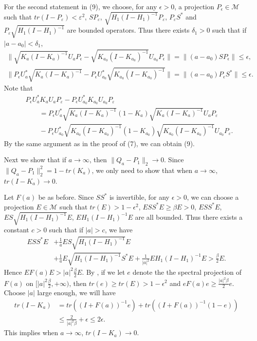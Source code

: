\documentclass[12pt]{article}
\newcommand{\MMM}{\mathcal M}
\begin{document}
{For the second statement in (9), we choose, for any $\epsilon > 0$,
a projection $P_\epsilon \in \MMM$ such that $tr(I -
P_{\varepsilon}) < \varepsilon^{2}$, $SP_{\varepsilon}$,
$\sqrt{H_{1}(I-H_{1})^{-1}}P_{\varepsilon}$,  $P_{\varepsilon}S^*$
and $P_{\varepsilon}\sqrt{H_{1}(I-H_{1})^{-1}}$ are bounded
operators. Thus there exists $\delta_{1} > 0$ such that if
$|a-a_{0}| < \delta_{1}$, 
\begin{align*}
\| \sqrt{K_a(I-K_a)^{-1}}U_{a}P_{\epsilon} -
\sqrt{K_{a_0}(I-K_{a_{0}})^{-1}}U_{a_0}P_{\epsilon}  \| = \|(a - a_0)SP_{\epsilon}  \| \leq
\epsilon, \\
 \|P_{\epsilon}U_{a}^*\sqrt{K_a(I-K_a)^{-1}} -
P_{\epsilon}U_{a_0}^*\sqrt{K_{a_0}(I-K_{a_{0}})^{-1}} \| = \|(a - a_0)P_{\epsilon}S^{*}  \| \leq
\epsilon.
\end{align*}
Note that 
\begin{align*}
&P_{\epsilon}U_a^*K_{a}U_aP_{\varepsilon}
-P_{\epsilon}U_{a_0}^*K_{a_0}U_{a_0}P_{\varepsilon}\\
& \qquad =P_{\epsilon}U_a^*\sqrt{K_{a}(I-K_{a})^{-1}}(1-K_{a})\sqrt{K_{a}(I-K_{a})^{-1}}U_aP_{\varepsilon}\\
& \qquad - P_{\epsilon}U_{a_0}^*\sqrt{K_{a_0}(I-K_{a_0})^{-1}}(1-K_{a_0})\sqrt{K_{a_0}(I-K_{a_0})^{-1}}U_{a_0}P_{\varepsilon}.
\end{align*}
By the same argument as in the proof of (7), we can obtain (9).

\vspace{2mm}

Next we show that if $a \rightarrow \infty$, then
$\|Q_{a} - P_1 \|_{2} \rightarrow 0$. Since $\|Q_{a} - P_1
\|_{2}^{2} = 1 - tr(K_a)$, we only need to show that when $a
\rightarrow \infty$, $tr(I-K_a) \rightarrow 0$.

Let $F(a)$ be as before. Since $SS^*$ is invertible, for any
$\epsilon > 0$, we can choose a projection $E \in \MMM$ such that
$tr(E) > 1 - \epsilon^2$, $ESS^{*}E \geq \beta E > 0$, $ESS^{*}E$,
$ES\sqrt{H_{1}(I-H_{1})^{-1}}E$, $EH_{1}(I-H_{1})^{-1}E$ are all
bounded. Thus there exists a constant $c > 0$ such that if $|a|
> c$, we have
\begin{align*}
ESS^{*}E &+ \frac{1}{\overline{a}}ES\sqrt{H_{1}(I-H_{1})^{-1}}E \\
& + \frac{1}{a}E\sqrt{H_{1}(I-H_{1})^{-1}}S^{*}E +
\frac{1}{|a|^2}EH_{1}(I-H_{1})^{-1}E > \frac{\beta}{2}E.
\end{align*}
Hence $EF(a)E>|a|^{2}\frac{\beta}{2}E$. By \cite[Lemma 3.2]{BV}, if
we let $e$ denote the  the spectral projection of $F(a)$ on
$[|a|^{2}\frac{\beta}{2}, +\infty)$, then $tr(e)\geq tr(E)> 1-
\epsilon^2$ and $e F(a)e \geq \frac{|a|^{2}\beta}{2}e$. Choose $|a|$
large enough, we will have
\begin{align*}
tr(I-K_a) &= tr((I + F(a))^{-1}e) + tr((I + F(a))^{-1}(1-e)) \\
          &\leq \frac{2}{|a|^2\beta} + \epsilon \leq 2\epsilon.
\end{align*}
This implies when $a \rightarrow \infty$, $tr(I-K_a) \rightarrow 0$.
\vspace{2mm}

}
\end{document}
